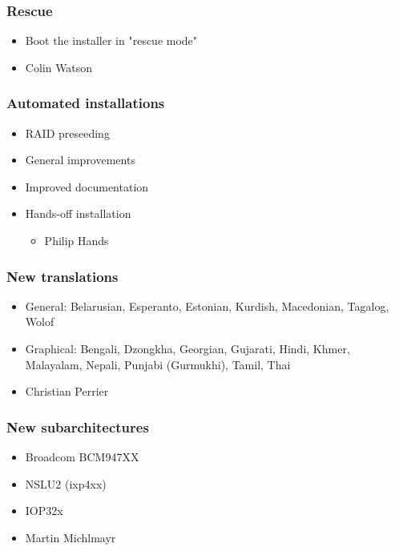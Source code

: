 \documentclass{beamer}
\begin{document}
\begin{frame}
  \frametitle{Rescue}
	\begin{itemize}
	\item
		Boot the installer in "rescue mode"
	\end{itemize}
	\begin{itemize}
	\item
		Colin Watson
	\end{itemize}
\end{frame}

\begin{frame}
  \frametitle{Automated installations}
	\begin{itemize}
	\item
		RAID preseeding
	\item
		General improvements
	\item
		Improved documentation
	\item
		Hands-off installation
		\begin{itemize}
		\item
			Philip Hands
		\end{itemize}
	\end{itemize}
\end{frame}

\begin{frame}
  \frametitle{New translations}
	\begin{itemize}
	\item
		General: Belarusian, Esperanto, Estonian, Kurdish, Macedonian, Tagalog, Wolof
	\item
		Graphical: Bengali, Dzongkha, Georgian, Gujarati, Hindi, Khmer, Malayalam, Nepali, Punjabi (Gurmukhi), Tamil, Thai
	\end{itemize}
	\begin{itemize}
	\item
		Christian Perrier
	\end{itemize}
\end{frame}

\begin{frame}
  \frametitle{New subarchitectures}
	\begin{itemize}
	\item
		Broadcom BCM947XX
	\item
		NSLU2 (ixp4xx)
	\item
		IOP32x
	\end{itemize}
	\begin{itemize}
	\item
		Martin Michlmayr
	\end{itemize}
\end{frame}
\end{document}
